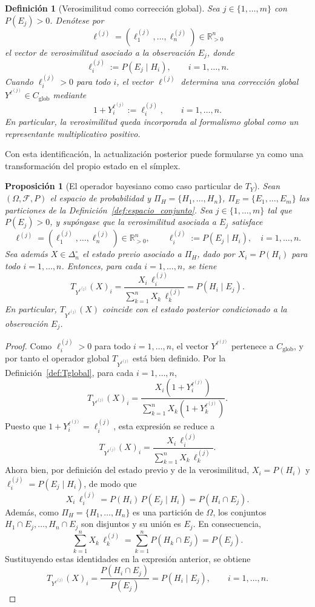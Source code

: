 ﻿\documentclass[12pt]{article}
\newtheorem{definicion}{Definición}[section]
\newtheorem{proposicion}{Proposición}[section]
\begin{document}
\begin{definicion}[Verosimilitud como corrección global]\label{def:verosimilitud}
Sea $j\in\{1,\dots,m\}$ con $P(E_j)>0$. Denótese por
\[
\ell^{(j)}=(\ell_1^{(j)},\dots,\ell_n^{(j)})\in\mathbb R_{>0}^n
\]
el vector de verosimilitud asociado a la observación $E_j$, donde
\[
\ell_i^{(j)}:=P(E_j\mid H_i),\qquad i=1,\dots,n.
\]
Cuando $\ell_i^{(j)}>0$ para todo $i$, el vector $\ell^{(j)}$ determina una corrección global $Y^{\ell^{(j)}}\in C_{\mathrm{glob}}$ mediante
\[
1+Y_i^{\ell^{(j)}}:=\ell_i^{(j)},\qquad i=1,\dots,n.
\]
En particular, la verosimilitud queda incorporada al formalismo global como un representante multiplicativo positivo.
\end{definicion}

Con esta identificación, la actualización posterior puede formularse ya como una transformación del propio estado en el símplex.
\begin{proposicion}[El operador bayesiano como caso particular de $T_Y$]\label{prop:bayes_como_TY}
Sean $(\Omega,\mathcal F,P)$ el espacio de probabilidad y $\Pi_H=\{H_1,\dots,H_n\}$, $\Pi_E=\{E_1,\dots,E_m\}$ las particiones de la Definición~\ref{def:espacio_conjunto}. Sea $j\in\{1,\dots,m\}$ tal que $P(E_j)>0$, y supóngase que la verosimilitud asociada a $E_j$ satisface
\[
\ell^{(j)}=(\ell_1^{(j)},\dots,\ell_n^{(j)})\in\mathbb R_{>0}^n,
\qquad
\ell_i^{(j)}:=P(E_j\mid H_i),\quad i=1,\dots,n.
\]
Sea además $X\in\Delta_n^\circ$ el estado previo asociado a $\Pi_H$, dado por $X_i=P(H_i)$ para todo $i=1,\dots,n$. Entonces, para cada $i=1,\dots,n$, se tiene
\[
T_{Y^{\ell^{(j)}}}(X)_i
=
\frac{X_i\,\ell_i^{(j)}}{\displaystyle\sum_{k=1}^n X_k\,\ell_k^{(j)}}
=
P(H_i\mid E_j).
\]
En particular, $T_{Y^{\ell^{(j)}}}(X)$ coincide con el estado posterior condicionado a la observación $E_j$.
\end{proposicion}

\begin{proof}
Como $\ell_i^{(j)}>0$ para todo $i=1,\dots,n$, el vector $Y^{\ell^{(j)}}$ pertenece a $C_{\mathrm{glob}}$, y por tanto el operador global $T_{Y^{\ell^{(j)}}}$ está bien definido. Por la Definición~\ref{def:Tglobal}, para cada $i=1,\dots,n$,
\[
T_{Y^{\ell^{(j)}}}(X)_i
=
\frac{X_i(1+Y_i^{\ell^{(j)}})}{\sum_{k=1}^n X_k(1+Y_k^{\ell^{(j)}})}.
\]
Puesto que $1+Y_i^{\ell^{(j)}}=\ell_i^{(j)}$, esta expresión se reduce a
\[
T_{Y^{\ell^{(j)}}}(X)_i
=
\frac{X_i\,\ell_i^{(j)}}{\sum_{k=1}^n X_k\,\ell_k^{(j)}}.
\]
Ahora bien, por definición del estado previo y de la verosimilitud, $X_i=P(H_i)$ y $\ell_i^{(j)}=P(E_j\mid H_i)$, de modo que
\[
X_i\,\ell_i^{(j)}=P(H_i)\,P(E_j\mid H_i)=P(H_i\cap E_j).
\]
Además, como $\Pi_H=\{H_1,\dots,H_n\}$ es una partición de $\Omega$, los conjuntos $H_1\cap E_j,\dots,H_n\cap E_j$ son disjuntos y su unión es $E_j$. En consecuencia,
\[
\sum_{k=1}^n X_k\,\ell_k^{(j)}=\sum_{k=1}^n P(H_k\cap E_j)=P(E_j).
\]
Sustituyendo estas identidades en la expresión anterior, se obtiene
\[
T_{Y^{\ell^{(j)}}}(X)_i
=
\frac{P(H_i\cap E_j)}{P(E_j)}
=
P(H_i\mid E_j),
\qquad i=1,\dots,n.
\]
\end{proof}
\end{document}
